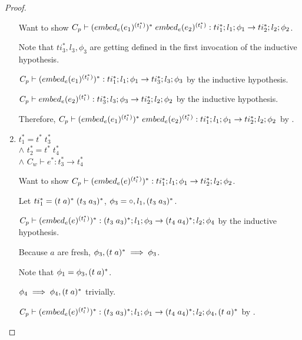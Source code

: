 \begin{proof}
\begin{enumerate}
        Want to show $C_p \vdash (\embed[e]{e_1}^{(t_l^{*})})^{*}\; \embed[e]{e_2}^{(t_l^{*})} : ti_1^{*};l_1;\phi_1 \rightarrow ti_2^{*};l_2;\phi_2$.

        Note that $ti_3^{*}, l_3, \phi_3$ are getting defined in the first invocation of the inductive hypothesis.

        $C_p \vdash (\embed[e]{e_1}^{(t_l^{*})})^{*} : ti_1^{*};l_1;\phi_1 \rightarrow ti_3^{*};l_3;\phi_3$ by the inductive hypothesis.

        $C_p \vdash \embed[e]{e_2}^{(t_l^{*})} : ti_3^{*};l_3;\phi_3 \rightarrow ti_2^{*};l_2;\phi_2$ by the inductive hypothesis.


        Therefore, $C_p \vdash (\embed[e]{e_1}^{(t_l^{*})})^{*}\; \embed[e]{e_2}^{(t_l^{*})} : ti_1^{*};l_1;\phi_1 \rightarrow ti_2^{*};l_2;\phi_2$ by .

        \item $t_1^{*} = t^{*}\; t_3^{*}$
        \\ $\land$ $t_2^{*} = t^{*}\; t_4^{*}$
        \\ $\land$ $C_w \vdash e^{*} : t_3^{*} \rightarrow t_4^{*}$

        Want to show $C_p \vdash (\embed[e]{e}^{(t_l^{*})})^{*} : ti_1^{*};l_1;\phi_1 \rightarrow ti_2^{*};l_2;\phi_2$.

        Let $ti_1^{*} = \ti{t}{a}^{*}\; \ti{t_3}{a_3}^{*}$, $\phi_3 = \circ,l_1,\ti{t_3}{a_3}^{*}$.

        $C_p \vdash (\embed[e]{e}^{(t_l^{*})})^{*} : \ti{t_3}{a_3}^{*};l_1;\phi_3 \rightarrow \ti{t_4}{a_4}^{*};l_2;\phi_4$ by the inductive hypothesis.

        Because $a$ are fresh, $\phi_3,\ti{t}{a}^{*} \implies \phi_3$.

        Note that $\phi_1 = \phi_3,\ti{t}{a}^{*}$.


        $\phi_4 \implies \phi_4,\ti{t}{a}^{*}$ trivially.

        $C_p \vdash (\embed[e]{e}^{(t_l^{*})})^{*} : \ti{t_3}{a_3}^{*};l_1;\phi_1 \rightarrow \ti{t_4}{a_4}^{*};l_2;\phi_4,\ti{t}{a}^{*}$ by .


\end{enumerate}
\end{proof}

